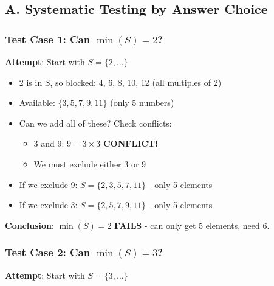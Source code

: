 \documentclass[12pt]{article}
\begin{document}
\begin{conversionbox}
\subsection*{A. Systematic Testing by Answer Choice}

\subsubsection*{Test Case 1: Can $\min(S) = 2$?}

\textbf{Attempt}: Start with $S = \{2, \ldots\}$

\begin{itemize}
    \item 2 is in $S$, so blocked: 4, 6, 8, 10, 12 (all multiples of 2)
    \item Available: $\{3, 5, 7, 9, 11\}$ (only 5 numbers)
    \item Can we add all of these? Check conflicts:
    \begin{itemize}
        \item 3 and 9: $9 = 3 \times 3$ \textbf{CONFLICT!}
        \item We must exclude either 3 or 9
    \end{itemize}
    \item If we exclude 9: $S = \{2, 3, 5, 7, 11\}$ - only 5 elements
    \item If we exclude 3: $S = \{2, 5, 7, 9, 11\}$ - only 5 elements
\end{itemize}

\textbf{Conclusion}: $\min(S) = 2$ \textbf{FAILS} - can only get 5 elements, need 6.

\subsubsection*{Test Case 2: Can $\min(S) = 3$?}

\textbf{Attempt}: Start with $S = \{3, \ldots\}$


\end{conversionbox}
\end{document}
